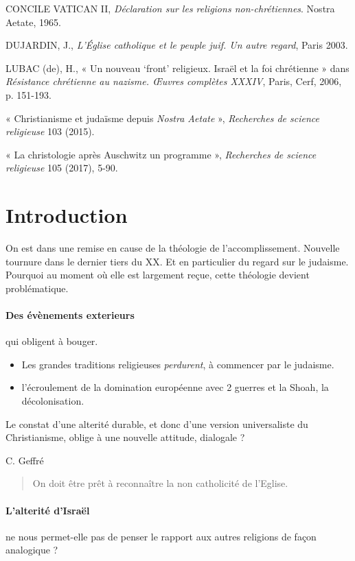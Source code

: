 CONCILE VATICAN II, \emph{Déclaration sur les religions
non-chrétiennes}. Nostra Aetate, 1965.

DUJARDIN, J., \emph{L'Église
catholique et le peuple juif. Un autre regard}, Paris 2003.

LUBAC (de), H., « Un nouveau `front' religieux. Israël et la foi
chrétienne » dans \emph{Résistance chrétienne au nazisme. Œuvres
complètes XXXIV}, Paris, Cerf, 2006, p. 151-193.

« Christianisme et judaïsme depuis \emph{Nostra Aetate} »,
\emph{Recherches de science religieuse} 103 (2015).

« La christologie après Auschwitz un programme », \emph{Recherches de
science religieuse} 105 (2017), 5-90.

\hypertarget{introduction}{%
\section{Introduction}\label{introduction}}

On est dans une remise en cause de la théologie de l'accomplissement. Nouvelle tournure dans le dernier tiers du XX. Et en particulier du regard sur le judaisme. Pourquoi au moment où elle est largement reçue, cette théologie devient problématique.

\paragraph{Des évènements exterieurs} qui obligent à bouger. 
\begin{itemize}
    \item Les grandes traditions religieuses \textit{perdurent}, à commencer par le judaisme. 
    \item l'écroulement de la domination européenne avec 2 guerres et la Shoah, la décolonisation. 
\end{itemize}

Le constat d'une alterité durable, et donc d'une version universaliste du Christianisme, oblige à une nouvelle attitude, dialogale ?

C. Geffré
\begin{quote}
    On doit être prêt à reconnaître la non catholicité de l'Eglise.
\end{quote}

\paragraph{L'alterité d'Israël} ne nous permet-elle pas de penser le rapport aux autres religions de façon analogique ? 
